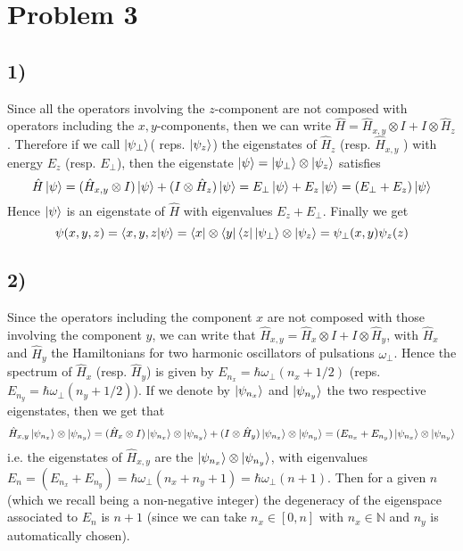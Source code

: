 \documentclass[10pt,a4paper]{book}
\begin{document}
\section*{Problem 3}


\subsection*{1)}

Since all the operators involving the $z$-component are not composed with operators including the $x,y$-components, then we can write $\hat{H}=\hat{H}_{x,y}\otimes I+I\otimes\hat{H}_z$. Therefore if we call $\ket{\psi_{\perp}}$( reps. $\ket{\psi_z}$) the eigenstates of $\hat{H}_z$ (resp. $\hat{H}_{x,y}$ ) with energy $E_z$ (resp. $E_{\perp}$), then the eigenstate $\ket{\psi}=\ket{\psi_{\perp}}\otimes\ket{\psi_z}$ satisfies
$$\hat{H}\ket{\psi}=(\hat{H}_{x,y}\otimes I)\ket{\psi}+(I\otimes\hat{H}_z)\ket{\psi}=E_{\perp}\ket{\psi}+E_z\ket{\psi}=(E_{\perp}+E_{z})\ket{\psi}$$
Hence $\ket{\psi}$ is an eigenstate of $\hat{H}$ with eigenvalues $E_z+E_{\perp}$. 
Finally we get 
$$\psi(x,y,z)=\braket{x,y,z|\psi}=\bra{x}\otimes\bra{y}\bra{z}\ket{\psi_{\perp}}\otimes\ket{\psi_z}=\psi_{\perp}(x,y)\psi_z(z)$$

\subsection*{2)}
Since the operators including the component $x$ are not composed with those involving the component $y$, we can write that $\hat{H}_{x,y}=\hat{H}_x\otimes I+I\otimes\hat{H}_y$, with $\hat{H}_x$ and $\hat{H}_y$ the Hamiltonians for two harmonic oscillators of pulsations $\omega_{\perp}$. Hence the spectrum of $\hat{H}_x$ (resp. $\hat{H}_y$) is given by $E_{n_x}=\hbar \omega_{\perp}(n_x+1/2)$ (reps. $E_{n_y}=\hbar\omega_{\perp}(n_y+1/2)$). If we denote by $\ket{\psi_{n_x}}$ and $\ket{\psi_{n_y}}$ the two respective eigenstates, then we get that
$$\hat{H}_{x,y}\ket{\psi_{n_x}}\otimes\ket{\psi_{n_y}}=(\hat{H}_x\otimes I)\ket{\psi_{n_x}}\otimes\ket{\psi_{n_y}}+(I\otimes\hat{H}_y)\ket{\psi_{n_x}}\otimes\ket{\psi_{n_y}}=(E_{n_x}+E_{n_y})\ket{\psi_{n_x}}\otimes\ket{\psi_{n_y}}$$
i.e. the eigenstates of $\hat{H}_{x,y}$ are the $\ket{\psi_{n_x}}\otimes\ket{\psi_{n_y}}$, with eigenvalues $E_n=(E_{n_x}+E_{n_y})=\hbar\omega_{\perp}(n_x+n_y+1)=\hbar\omega_{\perp}(n+1)$. Then for a given $n$ (which we recall being a non-negative integer) the degeneracy of the eigenspace associated to $E_n$ is $n+1$ (since we can take $n_x\in [0,n]$ with $n_x\in\mathbb{N}$ and $n_y$ is automatically chosen).
\end{document}
